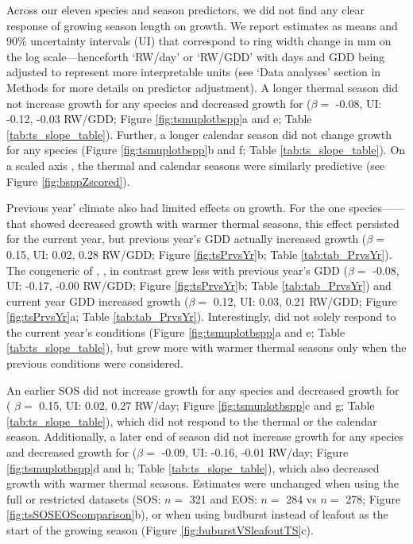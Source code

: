 Across our eleven species and season predictors, we did not find any clear response of growing season length on growth. 
We report estimates as means and 90\% uncertainty intervals (UI) that correspond to ring width change in mm on the log scale---henceforth `RW/day' or `RW/GDD' with days and GDD being adjusted to represent more interpretable units (see `Data analyses' section in Methods for more details on predictor adjustment).
A longer thermal season did not increase growth for any species and decreased growth for {\Ball}
($\beta =$ -0.08, UI:
-0.12,
-0.03 RW/GDD; Figure \ref{fig:tsmuplotbspp}a and e; Table \ref{tab:ts_slope_table}). 
Further, a longer calendar season did not change growth for any species (Figure \ref{fig:tsmuplotbspp}b and f; Table \ref{tab:ts_slope_table}). On a scaled axis \citep[through $z$-scoring,][]{gelman_data_2006}, the thermal and calendar seasons were similarly predictive (see Figure \ref{fig:bsppZscored}).

Previous year' climate also had limited effects on growth. For the one species---{\Ball}---that showed decreased growth with warmer thermal seasons, this effect persisted for the current year, but previous year's GDD actually increased growth 
($\beta =$ 0.15, UI:
0.02,
0.28 RW/GDD; Figure \ref{fig:tsPrvsYr}b; Table \ref{tab:tab_PrvsYr}). The congeneric of {\Ball}, {\Bnig}, in contrast grew less with previous year's GDD ($\beta =$ 
-0.08, UI:
-0.17,
-0.00 RW/GDD; Figure \ref{fig:tsPrvsYr}b; Table \ref{tab:tab_PrvsYr}) and current year GDD increased growth ($\beta =$ 
0.12, UI:
0.03,
0.21 RW/GDD; Figure \ref{fig:tsPrvsYr}a; Table \ref{tab:tab_PrvsYr}).
Interestingly, {\Bnig} did not solely respond to the current year's conditions (Figure \ref{fig:tsmuplotbspp}a and e; Table \ref{tab:ts_slope_table}), but grew more with warmer thermal seasons only when the previous conditions were considered. 

An earlier SOS did not increase growth for any species and decreased growth for {\Tame} (
$\beta =$ 0.15, UI:
0.02,
0.27 RW/day; Figure \ref{fig:tsmuplotbspp}c and g; Table \ref{tab:ts_slope_table}), which did not respond to the thermal or the calendar season. Additionally, a later end of season did not increase growth for any species and decreased growth for {\Ball}
($\beta =$ -0.09, UI:
-0.16,
-0.01 RW/day; Figure \ref{fig:tsmuplotbspp}d and h; Table \ref{tab:ts_slope_table}), which also decreased growth with warmer thermal seasons. Estimates were unchanged when using the full or restricted datasets (SOS: $n =$
321 and EOS: $n =$
284 vs $n =$
278; Figure \ref{fig:tsSOSEOScomparison}b), or when using budburst instead of leafout as the start of the growing season (Figure \ref{fig:buburstVSleafoutTS}c). 

